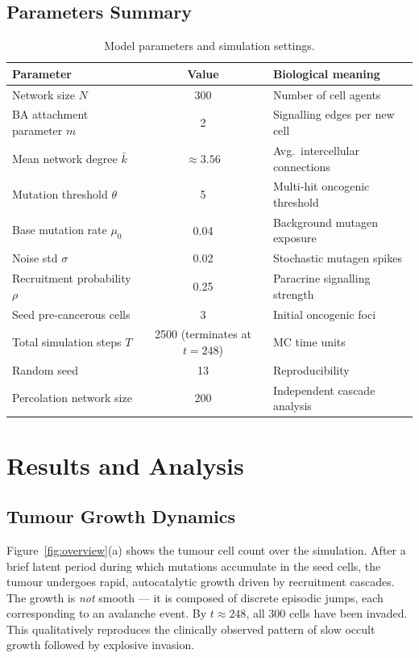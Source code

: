 \documentclass[12pt,a4paper]{article}
\begin{document}
\subsection{Parameters Summary}

\begin{table}[H]
\centering
\caption{Model parameters and simulation settings.}
\label{tab:params}
\renewcommand{\arraystretch}{1.25}
\begin{tabular}{p{5.5cm} c p{5cm}}
\toprule
\textbf{Parameter} & \textbf{Value} & \textbf{Biological meaning} \\
\midrule
Network size $N$ & 300 & Number of cell agents \\
BA attachment parameter $m$ & 2 & Signalling edges per new cell \\
Mean network degree $\bar{k}$ & $\approx 3.56$ & Avg.\ intercellular connections \\
Mutation threshold $\theta$ & 5 & Multi-hit oncogenic threshold \\
Base mutation rate $\mu_0$ & 0.04 & Background mutagen exposure \\
Noise std $\sigma$ & 0.02 & Stochastic mutagen spikes \\
Recruitment probability $\rho$ & 0.25 & Paracrine signalling strength \\
Seed pre-cancerous cells & 3 & Initial oncogenic foci \\
Total simulation steps $T$ & 2500 (terminates at $t=248$) & MC time units \\
Random seed & 13 & Reproducibility \\
Percolation network size & 200 & Independent cascade analysis \\
\bottomrule
\end{tabular}
\end{table}

\section{Results and Analysis}

\subsection{Tumour Growth Dynamics}

Figure~\ref{fig:overview}(a) shows the tumour cell count over the simulation.
After a brief latent period during which mutations accumulate in the seed cells,
the tumour undergoes rapid, autocatalytic growth driven by recruitment cascades.
The growth is \emph{not} smooth --- it is composed of discrete episodic jumps,
each corresponding to an avalanche event.  By $t \approx 248$, all 300 cells
have been invaded.  This qualitatively reproduces the clinically observed
pattern of slow occult growth followed by explosive invasion.
\end{document}
